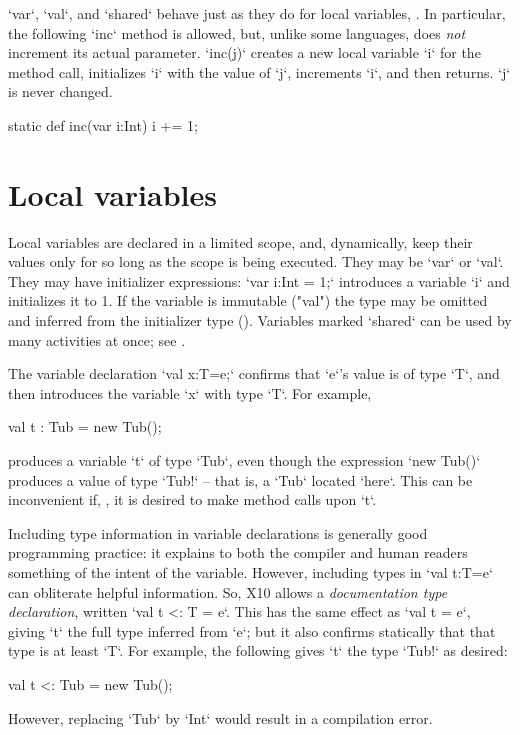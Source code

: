 \xcd`var`, \xcd`val`, and \xcd`shared` behave just as they do for local
variables, .  In particular, the following \xcd`inc`
method is allowed, but, unlike some languages, does {\em not} increment its
actual parameter.  \xcd`inc(j)` creates a new local 
variable \xcd`i` for the method call, initializes \xcd`i` with the value of
\xcd`j`, increments \xcd`i`, and then returns.  \xcd`j` is never changed.
\begin{xten}
static def inc(var i:Int) { i += 1; }
\end{xten}


\section{Local variables}\label{local-variables}
Local variables are declared in a limited scope, and, dynamically, keep their
values only for so long as the scope is being executed.  They may be \xcd`var`
or \xcd`val`.  
They may have 
initializer expressions: \xcd`var i:Int = 1;` introduces 
a variable \xcd`i` and initializes it to 1.
If the variable is immutable
(\xcd"val")
the type may be omitted and
inferred from the initializer type ().
Variables marked \xcd`shared` can be used by many activities at once; see
.

The variable declaration \xcd`val x:T=e;` confirms that \xcd`e`'s value is of
type \xcd`T`, and then introduces the variable \xcd`x` with type \xcd`T`.  For
example, 
\begin{xten}
   val t : Tub = new Tub();
\end{xten}
\noindent
produces a variable \xcd`t` of type \xcd`Tub`, even though the expression
\xcd`new Tub()` produces a value of type \xcd`Tub!` -- that is, a \xcd`Tub`
located \xcd`here`.    This can be inconvenient if, \eg, it is desired to make
method calls upon \xcd`t`.  

Including type information in variable declarations is generally good
programming practice: it explains to both the compiler and human readers
something of the intent of the variable.  However, including types in 
\xcd`val t:T=e` can obliterate helpful information.  So, X10 allows a {\em
documentation type declaration}, written \xcd`val t <: T = e`.  This 
has the same effect as \xcd`val t = e`, giving \xcd`t` the full type inferred
from \xcd`e`; but it also confirms statically that that type is at least
\xcd`T`.  For example, the following gives \xcd`t` the type \xcd`Tub!` as
desired: 
\begin{xten}
   val t <: Tub = new Tub();
\end{xten}
\noindent
However, replacing \xcd`Tub` by \xcd`Int` would result in a compilation error. 

